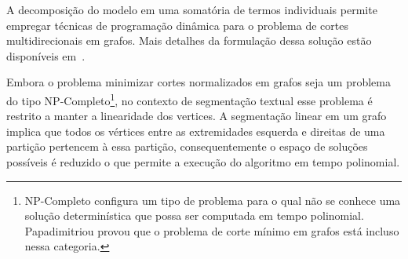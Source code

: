 A decomposição do modelo em uma somatória de termos individuais permite empregar técnicas de programação dinâmica para o problema de cortes multidirecionais em grafos. Mais detalhes da formulação dessa solução estão disponíveis em~\cite{Malioutov:2006a}.

Embora o problema minimizar cortes normalizados em grafos seja um problema do tipo NP-Completo\footnote{NP-Completo configura um tipo de problema para o qual não se conhece uma solução determinística que possa ser computada em tempo polinomial. Papadimitriou provou que o problema de corte mínimo em grafos está incluso nessa categoria.}, no contexto de segmentação textual esse problema é restrito a manter a linearidade dos vertices. A segmentação linear em um grafo implica que todos os vértices entre as extremidades esquerda e direitas de uma partição pertencem à essa partição, consequentemente o espaço de soluções possíveis é reduzido o que permite a execução do algoritmo em tempo polinomial.  

















 
